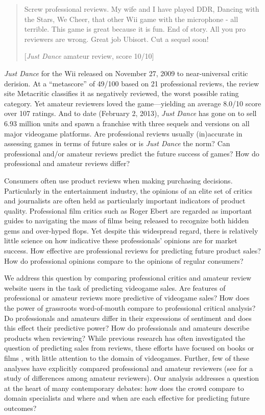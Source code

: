 \documentclass[letterpaper]{article}
\begin{document}
\begin{quote}
Screw professional reviews. My wife and I have played DDR, Dancing with the Stars, We Cheer, that other Wii game with the microphone - all terrible. This game is great because it is fun. End of story. All you pro reviewers are wrong. Great job Ubisort. Cut a sequel soon!

[\textit{Just Dance} amateur review, score 10/10]
\end{quote}

\textit{Just Dance} for the Wii released on November 27, 2009 to near-universal critic derision. At a ``metascore'' of 49/100 based on 21 professional reviews, the review site Metacritic classifies it as negatively reviewed, the worst possible rating category. Yet amateur reviewers loved the game---yielding an average 8.0/10 score over 107 ratings. And to date (February 2, 2013), \textit{Just Dance} has gone on to sell 6.93 million units and spawn a franchise with three sequels and versions on all major videogame platforms. Are professional reviews usually (in)accurate in assessing games in terms of future sales or is \textit{Just Dance} the norm? Can professional and/or amateur reviews predict the future success of games? How do professional and amateur reviews differ?

Consumers often use product reviews when making purchasing decisions. Particularly in the entertainment industry, the opinions of an elite set of critics and journalists are often held as particularly important indicators of product quality. Professional film critics such as Roger Ebert are regarded as important guides to navigating the mass of films being released to recognize both hidden gems and over-hyped flops. Yet despite this widespread regard, there is relatively little science on how indicative these professionals' opinions are for market success. How effective are professional reviews for predicting future product sales? How do professional opinions compare to the opinions of regular consumers?

We address this question by comparing professional critics and amateur review website users in the task of predicting videogame sales. Are features of professional or amateur reviews more predictive of videogame sales? How does the power of grassroots word-of-mouth compare to professional critical analysis? Do professionals and amateurs differ in their expressions of sentiment and does this effect their predictive power? How do professionals and amateurs describe products when reviewing? While previous research has often investigated the question of predicting sales from reviews, these efforts have focused on books \cite{gruhl2005predictive,forman2008examining,chevalier2003effect} or films \cite{dellarocas2007exploring,yu2012mining,duan2008online,liu2001word}, with little attention to the domain of videogames.
Further, few of these analyses have explicitly compared professional and amateur reviewers (see \cite{gilbert2010deja} for a study of differences among amateur reviewers). Our analysis addresses a question at the heart of many contemporary debates: how does the crowd compare to domain specialists and where and when are each effective for predicting future outcomes?
\end{document}
